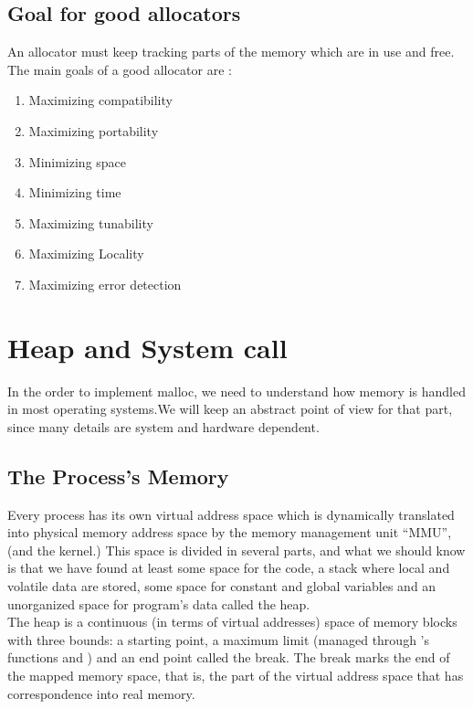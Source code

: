 \subsection{Goal for good allocators}
An allocator must keep tracking parts of the memory which are in use and free.
The main goals of a good allocator are \cite{Lea12}:
\begin{enumerate}
\item Maximizing compatibility\\

\item Maximizing portability

\item Minimizing space

\item Minimizing time
\item Maximizing tunability
\item Maximizing Locality
\item Maximizing error detection
\end{enumerate}
\clearpage
\section{Heap and System call}
In the order to implement malloc, we need to understand how memory is handled in most operating systems.We will keep an abstract point of view for that part, since many details are system and
hardware dependent.

\subsection{The Process’s Memory}
Every process has its own virtual address space which is dynamically translated into physical memory  address space by the memory management unit ``MMU'', (and the kernel.) This space is divided in several parts, and what we should know is that we have found at least some space for the code, a stack where local and volatile data are stored, some space for constant and global variables and an unorganized space for program’s data called the heap.\\

The heap is a continuous (in terms of virtual addresses) space of memory blocks with three bounds: a starting point, a maximum limit (managed through ’s functions  and ) and an end point called the break. The break marks the end of the mapped memory space, that is, the part of the virtual address space that has correspondence into real memory.\\

